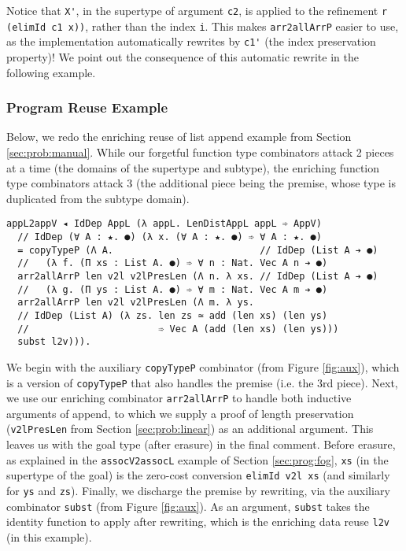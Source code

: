\documentclass[acmsmall,screen]{acmart}
\newcommand{\refsec}[1]{Section \ref{sec:#1}}
\newcommand{\reffig}[1]{Figure \ref{fig:#1}}
\begin{document}
Notice that \verb;X';, in the supertype  of argument \verb;c2;, is
applied to the refinement \verb;r (elimId c1 x));,
rather than the index \verb;i;.
This makes \verb;arr2allArrP; easier to use, as the
implementation automatically rewrites by \verb;c1'; (the index
preservation property)! We point out the consequence of this automatic
rewrite in the following example.

\subsubsection{Program Reuse Example}

Below, we redo the enriching reuse of list append example from
\refsec{prob:manual}. While our forgetful function type combinators
attack 2 pieces at a time (the domains of the supertype and subtype),
the enriching function type combinators attack 3 (the additional piece
being the premise, whose type is duplicated from the subtype domain).
\begin{verbatim}
appL2appV ◂ IdDep AppL (λ appL. LenDistAppL appL ➾ AppV)
  // IdDep (∀ A : ★. ●) (λ x. (∀ A : ★. ●) ➾ ∀ A : ★. ●)
  = copyTypeP (Λ A.                          // IdDep (List A ➔ ●) 
  //   (λ f. (Π xs : List A. ●) ➾ ∀ n : Nat. Vec A n ➔ ●)
  arr2allArrP len v2l v2lPresLen (Λ n. λ xs. // IdDep (List A ➔ ●) 
  //   (λ g. (Π ys : List A. ●) ➾ ∀ m : Nat. Vec A m ➔ ●)
  arr2allArrP len v2l v2lPresLen (Λ m. λ ys.
  // IdDep (List A) (λ zs. len zs ≃ add (len xs) (len ys)
  //                       ➾ Vec A (add (len xs) (len ys)))
  subst l2v))).
\end{verbatim}
We begin with the auxiliary \texttt{copyTypeP} combinator (from
\reffig{aux}), which is a version of \texttt{copyTypeP} that also
handles the premise (i.e. the 3rd piece). Next, we use our enriching
combinator \texttt{arr2allArrP} to handle both inductive arguments of
append, to which we supply a proof of length preservation
(\verb;v2lPresLen; from \refsec{prob:linear}) as an additional
argument. This leaves us with the goal type (after erasure) in the
final comment.  Before erasure, as explained in the
\verb;assocV2assocL; example of \refsec{prog:fog},
\verb;xs; (in the supertype of the goal) is the
zero-cost conversion \verb;elimId v2l xs; (and similarly for \verb;ys;
and \verb;zs;).  Finally, we discharge the premise by rewriting, via
the auxiliary combinator \verb;subst; (from \reffig{aux}). As an
argument, \verb;subst; takes the identity function to apply after
rewriting, which is the enriching data reuse \verb;l2v; (in this
example).
\end{document}
